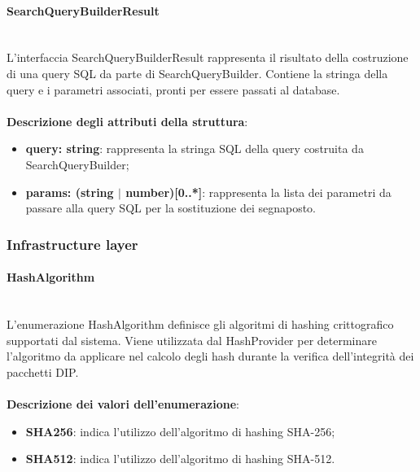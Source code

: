 \documentclass[a4paper,12pt]{article}
\begin{document}
                \paragraph{SearchQueryBuilderResult}\label{par:SearchQueryBuilderResult}\mbox{}\\
                L'interfaccia SearchQueryBuilderResult rappresenta il risultato della costruzione di una query SQL da parte di SearchQueryBuilder. Contiene la stringa della query e i parametri associati, pronti per essere passati al database.\\
                \\
                \textbf{Descrizione degli attributi della struttura}:
                \begin{itemize}
                    \item \textbf{query: string}: rappresenta la stringa SQL della query costruita da SearchQueryBuilder;
                    \item \textbf{params: (string $|$ number)[0..*]}: rappresenta la lista dei parametri da passare alla query SQL per la sostituzione dei segnaposto.
                \end{itemize}


            \subsubsection{Infrastructure layer} 
                \paragraph{HashAlgorithm}\label{par:HashAlgorithm}\mbox{}\\
                L'enumerazione HashAlgorithm definisce gli algoritmi di hashing crittografico supportati dal sistema. Viene utilizzata dal HashProvider per determinare l'algoritmo da applicare nel calcolo degli hash durante la verifica dell'integrità dei pacchetti DIP.\\
                \\
                \textbf{Descrizione dei valori dell'enumerazione}:
                \begin{itemize}
                    \item \textbf{SHA256}: indica l'utilizzo dell'algoritmo di hashing SHA-256;
                    \item \textbf{SHA512}: indica l'utilizzo dell'algoritmo di hashing SHA-512.
                \end{itemize}
\end{document}
